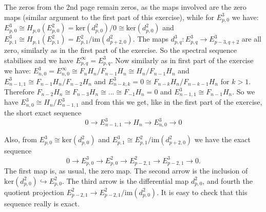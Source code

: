 \documentclass{article}
\begin{document}
\begin{center}\end{center}

The zeros from the 2nd page remain zeros, as the maps involved are the zero maps (similar argument to the first part of this exercise),
while for $E^3_{p,0}$ we have: $E^3_{p,0} \cong H_{p,0}(E^2_{p,0}) = \mathrm{ker} (d^2_{p,0})/0 \cong \mathrm{ker} (d^2_{p,0})$ and
$E^3_{p,1} \cong H_{p,1}(E^2_{p,1}) = E^2_{p,1} / \mathrm{im}(d^2_{p+2,0})$. The maps $d^3_{p,q} : E^3_{p,q} \to E^3_{p-3,q+2}$ are all zero, similarly as in the first part of the exercise. So the spectral sequence stabilises and we have $E^\infty_{p,q} = E^3_{p,q}$.
Now similarly as in first part of the exercise we have: $E^3_{n,0} = E^\infty_{n,0} \cong F_n H_n/F_{n-1}H_n \cong H_n/F_{n-1}H_n$ and $E^3_{n-1,1} \cong F_{n-1} H_n / F_{n-2} H_n$ and $E^3_{n-k,k} = 0 \cong F_{n-k} H_n / F_{n-k-1} H_n$ for $k>1$. Therefore $F_{n-2} H_n \cong F_{n-3} H_n \cong ... \cong F_{-1} H_n = 0$ and $E^3_{n-1,1} \cong F_{n-1} H_n$. So we have $E^3_{n,0} \cong H_n/E^3_{n-1,1}$ and from this we get, like in the first part of the exercise, the short exact sequence
\begin{equation*}
0 \to E^3_{n-1,1} \to H_n \to E^3_{n,0} \to 0
\end{equation*}


Also, from $E^3_{p,0} \cong \mathrm{ker}(d^2_{p,0})$ and $E^3_{p,1} \cong E^2_{p,1}/\mathrm{im}(d^2_{p+2,0})$ we have the exact sequence
\begin{equation*}
0 \to E^3_{p,0} \to E^2_{p,0} \to E^2_{p-2,1} \to E^3_{p-2,1} \to 0.
\end{equation*}
The first map is, as usual, the zero map. The second arrow is the inclusion of $\mathrm{ker}(d^2_{p,0}) \hookrightarrow E^2_{p,0}$. The third arrow is the differential map $d^2_{p,0}$, and fourth the quotient projection $E^2_{p-2,1} \to E^2_{p-2,1}/\mathrm{im}(d^2_{p,0})$. It is easy to check that this sequence really is exact.
\end{document}
